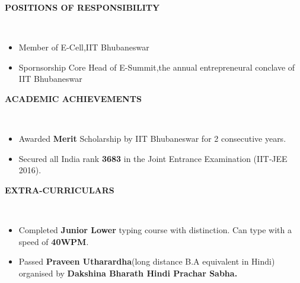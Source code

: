 \documentclass[a4paper,10pt]{article}
\newcommand{\lsep}{-0.5cm}
\newcommand{\resheading}[1]{{\small \colorbox{mygrey}{\begin{minipage}{0.975\textwidth}{\textbf{#1 \vphantom{p\^{E}}}}\end{minipage}}}}
\begin{document}
\resheading{\textbf{POSITIONS OF RESPONSIBILITY} }\\[\lsep]
\begin{itemize}
\item \noindent Member of E-Cell,IIT Bhubaneswar
\item \noindent Spornsorship Core Head of E-Summit,the annual entrepreneural conclave of IIT Bhubaneswar
\end{itemize}

\resheading{\textbf{ACADEMIC ACHIEVEMENTS} }\\[\lsep]
\begin{itemize}
\item \noindent Awarded \textbf{Merit} Scholarship by IIT Bhubaneswar for 2 consecutive years.
\item \noindent Secured all India rank \textbf{3683} in the Joint Entrance Examination (IIT‐JEE 2016). 
\end{itemize}

\resheading{\textbf{EXTRA-CURRICULARS} }\\[\lsep]
\begin{itemize}
\item \noindent Completed  \textbf {Junior Lower} typing course with distinction. Can type with a speed of \textbf{40WPM}.  
\item \noindent Passed \textbf{Praveen Utharardha}(long distance B.A equivalent in Hindi) organised by \textbf{Dakshina Bharath Hindi Prachar Sabha.} 
\end{itemize}
\end{document}
